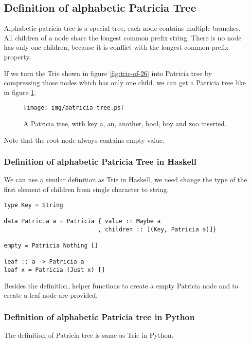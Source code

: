 \documentclass{article}
\begin{document}
\subsection{Definition of alphabetic Patricia Tree}
Alphabetic patricia tree is a special tree, each node contains
multiple branches. All children of a node share the longest common 
prefix string. There is no node has only one children, because it
is conflict with the longest common prefix property.

If we turn the Trie shown in figure \ref{fig:trie-of-26} into Patricia
tree by compressing those nodes which has only one child. we can get
a Patricia tree like in figure \ref{fig:patricia-tree}.

\begin{figure}[htbp]
  \begin{center}
    \texttt{[image: img/patricia-tree.ps]}
      \caption{A Patricia tree, with key a, an, another, bool,
    boy and zoo inserted.}
      \label{fig:patricia-tree}
  \end{center}
\end{figure}

Note that the root node always contains empty value.

\subsubsection*{Definition of alphabetic Patricia Tree in Haskell}
We can use a similar definition as Trie in Haskell, we need change
the type of the first element of children from single character to
string.

\lstset{language=Haskell}
\begin{lstlisting}
type Key = String

data Patricia a = Patricia { value :: Maybe a
                           , children :: [(Key, Patricia a)]}

empty = Patricia Nothing []

leaf :: a -> Patricia a
leaf x = Patricia (Just x) []
\end{lstlisting}

Besides the definition, helper functions to create a empty
Patricia node and to create a leaf node are provided.

\subsubsection*{Definition of alphabetic Patricia tree in Python}
The definition of Patricia tree is same as Trie in Python.
\end{document}
